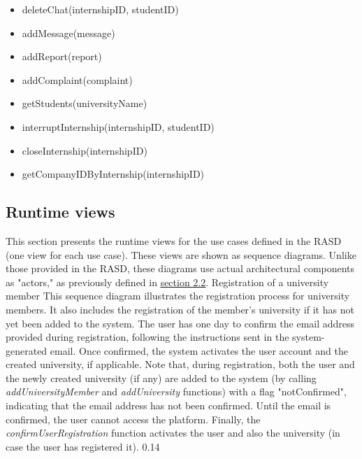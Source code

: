 \begin{itemize}
\begin{itemize}
        \item deleteChat(internshipID, studentID)
        \item addMessage(message)
        \item addReport(report)
        \item addComplaint(complaint)
        \item getStudents(universityName)
        \item interruptInternship(internshipID, studentID)
        \item closeInternship(internshipID)
        \item getCompanyIDByInternship(internshipID)
    \end{itemize}
\end{itemize}

\newpage

\subsection{Runtime views}
This section presents the runtime views for the use cases defined in the RASD (one view for each use case). These views are shown as sequence diagrams. Unlike those provided in the RASD, these diagrams use actual architectural components as "actors," as previously defined in \underline{\hyperref[section2.2]{section 2.2}}.
\runtimeview
{Registration of a university member}
{
    This sequence diagram illustrates the registration process for university members. It also includes the registration of the member's university if it has not yet been added to the system. The user has one day to confirm the email address provided during registration, following the instructions sent in the system-generated email. Once confirmed, the system activates the user account and the created university, if applicable. Note that, during registration, both the user and the newly created university (if any) are added to the system (by calling \textit{addUniversityMember} and \textit{addUniversity} functions) with a flag "notConfirmed", indicating that the email address has not been confirmed. Until the email is confirmed, the user cannot access the platform. Finally, the \textit{confirmUserRegistration} function activates the user and also the university (in case the user has registered it).
}
{0.14}

